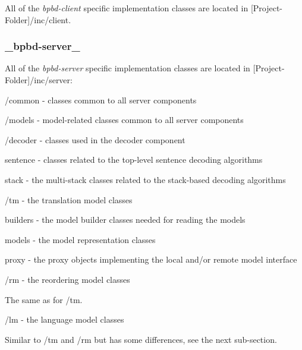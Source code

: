 All of the {\itshape bpbd-\/client} specific implementation classes are located in {\ttfamily \mbox{[}Project-\/\+Folder\mbox{]}/inc/client}.

\subsubsection*{\+\_\+bpbd-\/server\+\_\+}

All of the {\itshape bpbd-\/server} specific implementation classes are located in {\ttfamily \mbox{[}Project-\/\+Folder\mbox{]}/inc/server}\+:


\begin{DoxyItemize}
\item {\ttfamily /common} -\/ classes common to all server components
\begin{DoxyItemize}
\item {\ttfamily /models} -\/ model-\/related classes common to all server components
\end{DoxyItemize}
\item {\ttfamily /decoder} -\/ classes used in the decoder component
\begin{DoxyItemize}
\item {\ttfamily sentence} -\/ classes related to the top-\/level sentence decoding algorithms
\item {\ttfamily stack} -\/ the multi-\/stack classes related to the stack-\/based decoding algorithms
\end{DoxyItemize}
\item {\ttfamily /tm} -\/ the translation model classes
\begin{DoxyItemize}
\item {\ttfamily builders} -\/ the model builder classes needed for reading the models
\item {\ttfamily models} -\/ the model representation classes
\item {\ttfamily proxy} -\/ the proxy objects implementing the local and/or remote model interface
\end{DoxyItemize}
\item {\ttfamily /rm} -\/ the reordering model classes
\begin{DoxyItemize}
\item The same as for {\ttfamily /tm}.
\end{DoxyItemize}
\item {\ttfamily /lm} -\/ the language model classes
\begin{DoxyItemize}
\item Similar to {\ttfamily /tm} and {\ttfamily /rm} but has some differences, see the next sub-\/section.
\end{DoxyItemize}
\end{DoxyItemize}

